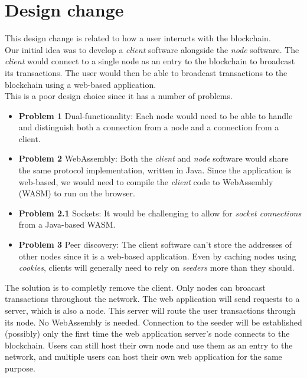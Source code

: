 \documentclass{article}
\begin{document}
\pagebreak

\section{Design change}

This design change is related to how a user interacts with the blockchain. \\
Our initial idea was to develop a \textit{client} software alongside the \textit{node} software.
The \textit{client} would connect to a single node as an entry to the blockchain to broadcast its transactions.
The user would then be able to broadcast transactions to the blockchain using a web-based application. \\
This is a poor design choice since it has a number of problems.

\begin{itemize}
    \item \textbf{Problem 1} Dual-functionality: Each node would need to be able to handle and distinguish both a connection
    from a node and a connection from a client.
    \item \textbf{Problem 2} WebAssembly: Both the \textit{client} and \textit{node} software would share the same
    protocol implementation, written in Java. Since the application is web-based, we would need to
    compile the \textit{client} code to WebAssembly (WASM) to run on the browser.
    \item \textbf{Problem 2.1} Sockets: It would be challenging to allow for \textit{socket connections}
    from a Java-based WASM.
    \item \textbf{Problem 3} Peer discovery: The client software can't store the addresses of other nodes
    since it is a web-based application. Even by caching nodes using \textit{cookies}, clients will generally
    need to rely on \textit{seeders} more than they should.
\end{itemize}

The solution is to completly remove the client. Only nodes can broacast transactions throughout the network.
The web application will send requests to a server, which is also a node.
This server will route the user transactions through its node.
No WebAssembly is needed. Connection to the seeder will be established (possibly) only the first time the web
application server's node connects to the blockchain. Users can still host their own node and use them as an entry to the network, and
multiple users can host their own web application for the same purpose.
\end{document}
